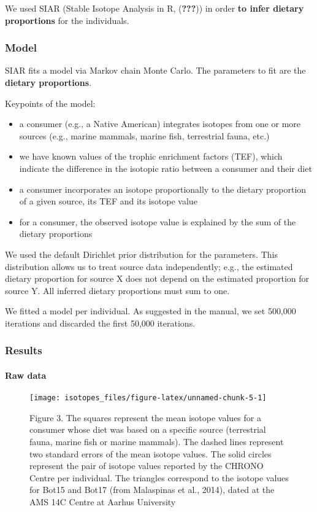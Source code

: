 \documentclass[]{article}
\providecommand{\tightlist}{%
  \setlength{\itemsep}{0pt}\setlength{\parskip}{0pt}}
\let\oldparagraph\paragraph
\renewcommand{\paragraph}[1]{\oldparagraph{#1}\mbox{}}
\begin{document}
We used SIAR (Stable Isotope Analysis in R, ({\textbf{???}})) in order
\textbf{to infer dietary proportions} for the individuals.

\hypertarget{model}{%
\subsubsection{Model}\label{model}}

SIAR fits a model via Markov chain Monte Carlo. The parameters to fit
are the \textbf{dietary proportions}.

Keypoints of the model:

\begin{itemize}
\tightlist
\item
  a consumer (e.g., a Native American) integrates isotopes from one or
  more sources (e.g., marine mammals, marine fish, terrestrial fauna,
  etc.)
\item
  we have known values of the trophic enrichment factors (TEF), which
  indicate the difference in the isotopic ratio between a consumer and
  their diet
\item
  a consumer incorporates an isotope proportionally to the dietary
  proportion of a given source, its TEF and its isotope value
\item
  for a consumer, the observed isotope value is explained by the sum of
  the dietary proportions
\end{itemize}

We used the default Dirichlet prior distribution for the parameters.
This distribution allows us to treat source data independently; e.g.,
the estimated dietary proportion for source X does not depend on the
estimated proportion for source Y. All inferred dietary proportions must
sum to one.

We fitted a model per individual. As suggested in the manual, we set
500,000 iterations and discarded the first 50,000 iterations.

\hypertarget{results}{%
\subsubsection{Results}\label{results}}

\hypertarget{raw-data}{%
\paragraph{Raw data}\label{raw-data}}

\begin{figure}
\texttt{[image: isotopes\_files/figure-latex/unnamed-chunk-5-1]} \caption{\label{fig:rawdata}Figure 3. The squares represent the mean isotope values for a consumer whose diet was
based on a specific source (terrestrial fauna, marine fish or marine mammals).
The dashed lines represent two standard errors of the mean isotope values.
The solid circles represent the pair of isotope values reported by the CHRONO Centre per individual. 
The triangles correspond to the isotope values for Bot15 and Bot17 (from Malaspinas et al., 2014),
dated at the AMS 14C Centre at Aarhus University}\label{fig:unnamed-chunk-5}
\end{figure}
\end{document}
